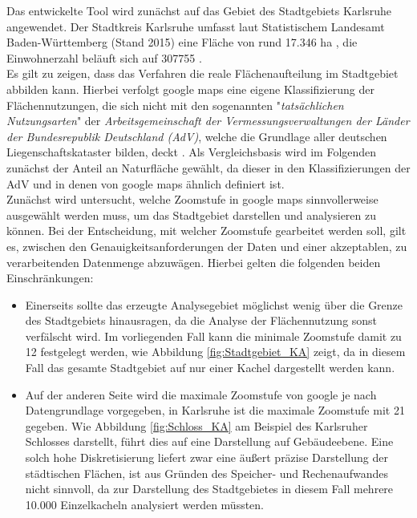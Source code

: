 Das entwickelte Tool wird zunächst auf das Gebiet des Stadtgebiets Karlsruhe angewendet. Der Stadtkreis Karlsruhe umfasst laut Statistischem Landesamt Baden-Württemberg (Stand 2015) eine Fläche von rund \num{17.346} \si{\hectare} \cite{StatBaWu_Flaeche}, die Einwohnerzahl beläuft sich auf \num{307755} \cite{StatBaWu_Einw}.\\
Es gilt zu zeigen, dass das Verfahren die reale Flächenaufteilung im Stadtgebiet abbilden kann. Hierbei verfolgt google maps eine eigene Klassifizierung der Flächennutzungen, die sich nicht mit den sogenannten "\textit{tatsächlichen Nutzungsarten}" der  \textit{Arbeitsgemeinschaft der Vermessungsverwaltungen der Länder der Bundesrepublik Deutschland (AdV)}, welche die Grundlage aller deutschen Liegenschaftskataster bilden, deckt \cite{advnutz}. Als Vergleichsbasis wird im Folgenden zunächst der Anteil an Naturfläche gewählt, da dieser in den Klassifizierungen der AdV und in denen von google maps ähnlich definiert ist.\\ 
\newline
Zunächst wird untersucht, welche Zoomstufe in google maps sinnvollerweise ausgewählt werden muss, um das Stadtgebiet darstellen und analysieren zu können. Bei der Entscheidung, mit welcher Zoomstufe gearbeitet werden soll, gilt es, zwischen den Genauigkeitsanforderungen  der Daten und einer akzeptablen, zu verarbeitenden Datenmenge abzuwägen. Hierbei gelten die folgenden beiden Einschränkungen:
\begin{itemize}
\item Einerseits sollte das erzeugte Analysegebiet möglichst wenig über die Grenze des Stadtgebiets hinausragen, da die Analyse der Flächennutzung sonst verfälscht wird. Im vorliegenden Fall kann die minimale Zoomstufe damit zu 12 festgelegt werden, wie Abbildung \ref{fig:Stadtgebiet_KA} zeigt, da in diesem Fall das gesamte Stadtgebiet auf nur einer Kachel dargestellt werden kann.
\item Auf der anderen Seite wird die maximale Zoomstufe von google je nach Datengrundlage vorgegeben, in Karlsruhe ist die maximale Zoomstufe mit 21 gegeben. Wie Abbildung \ref{fig:Schloss_KA} am Beispiel des Karlsruher Schlosses darstellt, führt dies auf eine Darstellung auf Gebäudeebene. Eine solch hohe Diskretisierung liefert zwar eine äußert präzise Darstellung der städtischen Flächen, ist aus Gründen des Speicher- und Rechenaufwandes nicht sinnvoll, da zur Darstellung des Stadtgebietes in diesem Fall mehrere 10.000 Einzelkacheln analysiert werden müssten.
\end{itemize}
